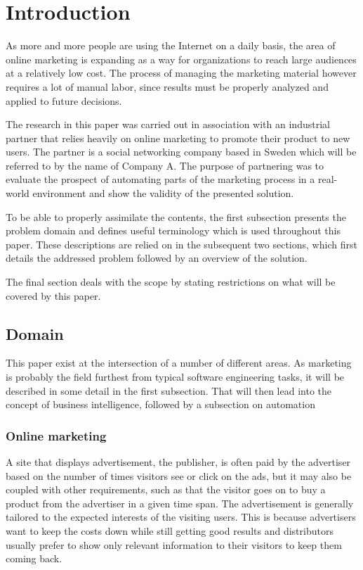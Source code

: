 \documentclass{sig-alternate}
\begin{document}
\section{Introduction}
As more and more people are using the Internet on a daily basis, the area of online marketing is expanding as a way for organizations to reach large audiences at a relatively low cost. The process of managing the marketing material however requires a lot of manual labor, since results must be properly analyzed and applied to future decisions.

The research in this paper was carried out in association with an industrial partner that relies heavily on online marketing to promote their product to new users. The partner is a social networking company based in Sweden which will be referred to by the name of Company A. The purpose of partnering was to evaluate the prospect of automating parts of the marketing process in a real-world environment and show the validity of the presented solution.

To be able to properly assimilate the contents, the first subsection presents the problem domain and defines useful terminology which is used throughout this paper. These descriptions are relied on in the subsequent two sections, which first details the addressed problem followed by an overview of the solution.

The final section deals with the scope by stating restrictions on what will be covered by this paper.

\subsection{Domain}
This paper exist at the intersection of a number of different areas. As marketing is probably the field furthest from typical software engineering tasks, it will be described in some detail in the first subsection. That will then lead into the concept of business intelligence, followed by a subsection on automation

\subsubsection{Online marketing}
A site that displays advertisement, the publisher, is often paid by the advertiser based on the number of times visitors see or click on the ads, but it may also be coupled with other requirements, such as that the visitor goes on to buy a product from the advertiser in a given time span. The advertisement is generally tailored to the expected interests of the visiting users. This is because advertisers want to keep the costs down while still getting good results and distributors usually prefer to show only relevant information to their visitors to keep them coming back.
\end{document}
